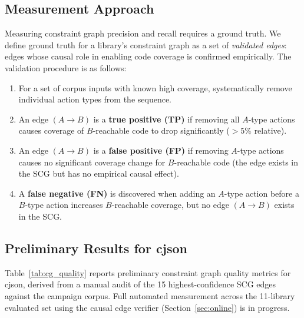\subsection{Measurement Approach}
\label{sec:eval_cg_quality_method}

Measuring constraint graph precision and recall requires a ground truth. We define ground truth for a library's constraint graph as a set of \emph{validated edges}: edges whose causal role in enabling code coverage is confirmed empirically. The validation procedure is as follows:

\begin{enumerate}[leftmargin=*, label=(\roman*)]
  \item For a set of corpus inputs with known high coverage, systematically remove individual action types from the sequence.
  \item An edge $(A \to B)$ is a \textbf{true positive (TP)} if removing all $A$-type actions causes coverage of $B$-reachable code to drop significantly ($> 5\%$ relative).
  \item An edge $(A \to B)$ is a \textbf{false positive (FP)} if removing $A$-type actions causes no significant coverage change for $B$-reachable code (the edge exists in the SCG but has no empirical causal effect).
  \item A \textbf{false negative (FN)} is discovered when adding an $A$-type action before a $B$-type action increases $B$-reachable coverage, but no edge $(A \to B)$ exists in the SCG.
\end{enumerate}

\subsection{Preliminary Results for cjson}
\label{sec:eval_cg_quality_cjson}

Table~\ref{tab:cg_quality} reports preliminary constraint graph quality metrics for cjson, derived from a manual audit of the 15 highest-confidence SCG edges against the campaign corpus. Full automated measurement across the 11-library evaluated set using the causal edge verifier (Section~\ref{sec:online}) is in progress.

\begin{table}[htb]
\centering
\caption{Preliminary constraint graph quality metrics for cjson (manual audit of top-15 edges). Full automated evaluation across the 11-library evaluated set is pending.}
\label{tab:cg_quality}
\end{table}

